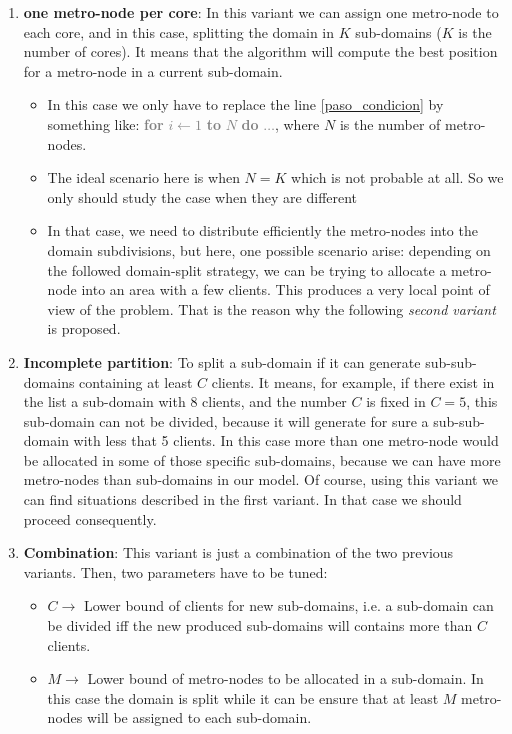 \begin{enumerate}
\item {\bf one metro-node per core}: In this variant we can assign one metro-node to each core, and in this case, splitting the domain in $K$ sub-domains ($K$ is the number of cores). It means that the algorithm will compute the best position for a metro-node in a current sub-domain. \label{var1}
\begin{itemize}
\item In this case we only have to replace the line \ref{paso_condicion} by something like:  \textcolor{gray}{{\bf for} $i \leftarrow 1$ {\bf to} $N$ {\bf do} $\dots$}, 
where $N$ is the number of metro-nodes.
\item The ideal scenario here is when $N = K$ which is not probable at all. So we only should study the case when they are different
\item In that case, we need to distribute efficiently the metro-nodes into the domain subdivisions, but here, one possible scenario arise: depending on the followed domain-split strategy, we can be trying to allocate a metro-node into an area with a few clients. This produces a very local point of view of the problem. That is the reason why the following \textit{second variant} is proposed.
\end{itemize}
\item {\bf Incomplete partition}: To split a sub-domain if it can generate sub-sub-domains containing at least $C$ clients. It means, for example, if there exist in the list a sub-domain with 8 clients, and the number $C$ is fixed in $C = 5$, this sub-domain can not be divided, because it will generate for sure a sub-sub-domain with less that 5 clients. In this case more than one metro-node would be allocated in some of those specific sub-domains, because we can have more metro-nodes than sub-domains in our model. Of course, using this variant we can find situations described in the first variant. In that case we should proceed consequently. \label{var2}
\item {\bf Combination}: This variant is just a combination of the two previous variants. Then, two parameters have to be tuned: \label{var3}
\begin{itemize}
\item $C \rightarrow$ Lower bound of clients for new sub-domains, i.e. a sub-domain can be divided iff the new produced sub-domains will contains more than $C$ clients.
\item $M \rightarrow$ Lower bound of metro-nodes to be allocated in a sub-domain. In this case the domain is split while it can be ensure that at least $M$ metro-nodes will be assigned to each sub-domain.
\end{itemize}
\end{enumerate}

